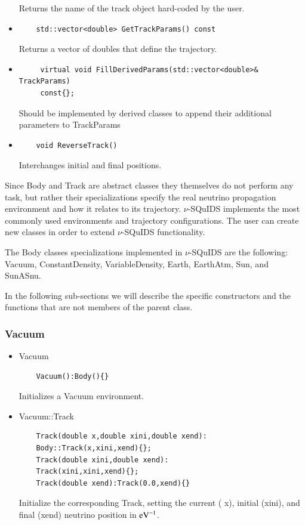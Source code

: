 \documentclass[3p,12pt]{elsarticle}
\newcommand{\ttf}{\ttfamily}
\begin{document}
\begin{itemize}
\begin{lstlisting}
  \end{lstlisting}
  Returns the name of the track object hard-coded by the user. 
\item  
  \begin{lstlisting}
    std::vector<double> GetTrackParams() const 
  \end{lstlisting}           
  Returns a vector of doubles that define the trajectory.
\item 
   \begin{lstlisting}
     virtual void FillDerivedParams(std::vector<double>& TrackParams)
     const{};
  \end{lstlisting}           
  Should be implemented by derived classes to append their
  additional parameters to TrackParams
  
\item 
  \begin{lstlisting}
    void ReverseTrack() 
  \end{lstlisting}
  Interchanges initial and final positions.
\end{itemize}


Since {\ttf Body} and {\ttf Track} are abstract classes they themselves do not perform any task, but rather their specializations specify the real neutrino propagation environment and how it relates to its trajectory. $\nu$-SQuIDS implements the most commonly used environments and trajectory configurations. The user can create new classes in order to extend $\nu$-SQuIDS functionality.

The {\ttf Body} classes specializations implemented in $\nu$-SQuIDS
are the following: {\ttf Vacuum}, {\ttf ConstantDensity}, {\ttf
  VariableDensity}, {\ttf Earth}, {\ttf EarthAtm}, {\ttf Sun}, and {\ttf SunASnu}.

In the following sub-sections we will describe the specific
constructors and the functions that are not members of the parent class.

\subsubsection{Vacuum \label{sec:vacuum}}

\begin{itemize}
\item {\ttf Vacuum}
  \begin{lstlisting}
    Vacuum():Body(){}
  \end{lstlisting}
  Initializes a {\ttf Vacuum} environment. 
\item {\ttf Vacuum::Track}
  \begin{lstlisting}
    Track(double x,double xini,double xend):
    Body::Track(x,xini,xend){};
    Track(double xini,double xend):
    Track(xini,xini,xend){};
    Track(double xend):Track(0.0,xend){}
  \end{lstlisting}
  Initialize the corresponding {\ttf Track}, setting the current ({\ttf
    x}), initial ({\ttf xini}), and final ({\ttf xend}) neutrino position in ${\rm eV}^{-1}$.
\end{itemize}
\end{document}
